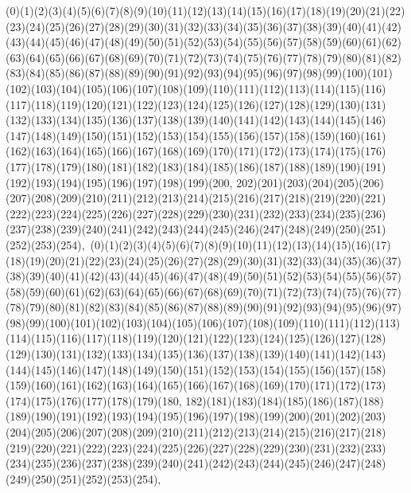\documentclass[12pt]{article}
\begin{document}
{(0)(1)(2)(3)(4)(5)(6)(7)(8)(9)(10)(11)(12)(13)(14)(15)(16)(17)(18)(19)(20)(21)(22)(23)(24)(25)(26)(27)(28)(29)(30)(31)(32)(33)(34)(35)(36)(37)(38)(39)(40)(41)(42)(43)(44)(45)(46)(47)(48)(49)(50)(51)(52)(53)(54)(55)(56)(57)(58)(59)(60)(61)(62)(63)(64)(65)(66)(67)(68)(69)(70)(71)(72)(73)(74)(75)(76)(77)(78)(79)(80)(81)(82)(83)(84)(85)(86)(87)(88)(89)(90)(91)(92)(93)(94)(95)(96)(97)(98)(99)(100)(101)(102)(103)(104)(105)(106)(107)(108)(109)(110)(111)(112)(113)(114)(115)(116)(117)(118)(119)(120)(121)(122)(123)(124)(125)(126)(127)(128)(129)(130)(131)(132)(133)(134)(135)(136)(137)(138)(139)(140)(141)(142)(143)(144)(145)(146)(147)(148)(149)(150)(151)(152)(153)(154)(155)(156)(157)(158)(159)(160)(161)(162)(163)(164)(165)(166)(167)(168)(169)(170)(171)(172)(173)(174)(175)(176)(177)(178)(179)(180)(181)(182)(183)(184)(185)(186)(187)(188)(189)(190)(191)(192)(193)(194)(195)(196)(197)(198)(199)(200, 202)(201)(203)(204)(205)(206)(207)(208)(209)(210)(211)(212)(213)(214)(215)(216)(217)(218)(219)(220)(221)(222)(223)(224)(225)(226)(227)(228)(229)(230)(231)(232)(233)(234)(235)(236)(237)(238)(239)(240)(241)(242)(243)(244)(245)(246)(247)(248)(249)(250)(251)(252)(253)(254)$
, 
$
(0)(1)(2)(3)(4)(5)(6)(7)(8)(9)(10)(11)(12)(13)(14)(15)(16)(17)(18)(19)(20)(21)(22)(23)(24)(25)(26)(27)(28)(29)(30)(31)(32)(33)(34)(35)(36)(37)(38)(39)(40)(41)(42)(43)(44)(45)(46)(47)(48)(49)(50)(51)(52)(53)(54)(55)(56)(57)(58)(59)(60)(61)(62)(63)(64)(65)(66)(67)(68)(69)(70)(71)(72)(73)(74)(75)(76)(77)(78)(79)(80)(81)(82)(83)(84)(85)(86)(87)(88)(89)(90)(91)(92)(93)(94)(95)(96)(97)(98)(99)(100)(101)(102)(103)(104)(105)(106)(107)(108)(109)(110)(111)(112)(113)(114)(115)(116)(117)(118)(119)(120)(121)(122)(123)(124)(125)(126)(127)(128)(129)(130)(131)(132)(133)(134)(135)(136)(137)(138)(139)(140)(141)(142)(143)(144)(145)(146)(147)(148)(149)(150)(151)(152)(153)(154)(155)(156)(157)(158)(159)(160)(161)(162)(163)(164)(165)(166)(167)(168)(169)(170)(171)(172)(173)(174)(175)(176)(177)(178)(179)(180, 182)(181)(183)(184)(185)(186)(187)(188)(189)(190)(191)(192)(193)(194)(195)(196)(197)(198)(199)(200)(201)(202)(203)(204)(205)(206)(207)(208)(209)(210)(211)(212)(213)(214)(215)(216)(217)(218)(219)(220)(221)(222)(223)(224)(225)(226)(227)(228)(229)(230)(231)(232)(233)(234)(235)(236)(237)(238)(239)(240)(241)(242)(243)(244)(245)(246)(247)(248)(249)(250)(251)(252)(253)(254)$
, 
$
}
\end{document}

